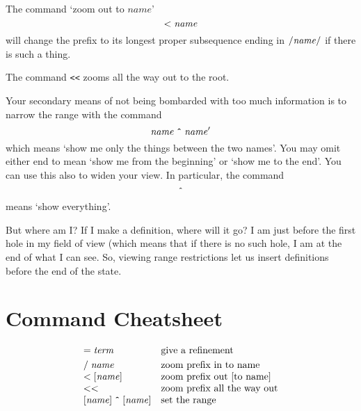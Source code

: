 \documentclass{article}
\newcommand*\cleartoleftpage{%
  \clearpage
  \ifodd\value{page}\hbox{}\newpage\fi
}
\begin{document}
The command `zoom out to $\mathit{name}$'
\[
{\tt <}\;\mathit{name}
\]
will change the prefix to its longest proper subsequence ending in
${\tt /}\mathit{name}{\tt /}$
if there is such a thing.

The command {\tt <<} zooms all the way out to the root.

Your secondary means of not being bombarded with too much information is to narrow
the range with the command
\[
\mathit{name}\;\mbox{\tt \^{}}\;\mathit{name}'
\]
which means `show me only the things between the two names'. You may omit either end
to mean `show me from the beginning' or `show me to the end'. You can use this also to
widen your view. In particular, the command
\[
\mbox{\tt \^{}}
\]
means `show everything'.

But where am I? If I make a definition, where will it go? I am just before
the first hole in my field of view (which means that if there is no such hole, I am at the
end of what I can see. So, viewing range restrictions let us insert definitions
before the end of the state.



\cleartoleftpage
\appendix

\section{Command Cheatsheet}

\[\begin{array}{ll}
{\tt =}\;\mathit{term} & \mbox{give a refinement} \smallskip\\

{\tt /}\;\mathit{name} & \mbox{zoom prefix in to name}\\
{\tt <}\;[\mathit{name}] & \mbox{zoom prefix out [to name]}\\
{\tt <<} & \mbox{zoom prefix all the way out}\\
{}[\mathit{name}]\;\mbox{\tt \^{}}\;[\mathit{name}] & \mbox{set the range}\\
\end{array}\]
\end{document}
